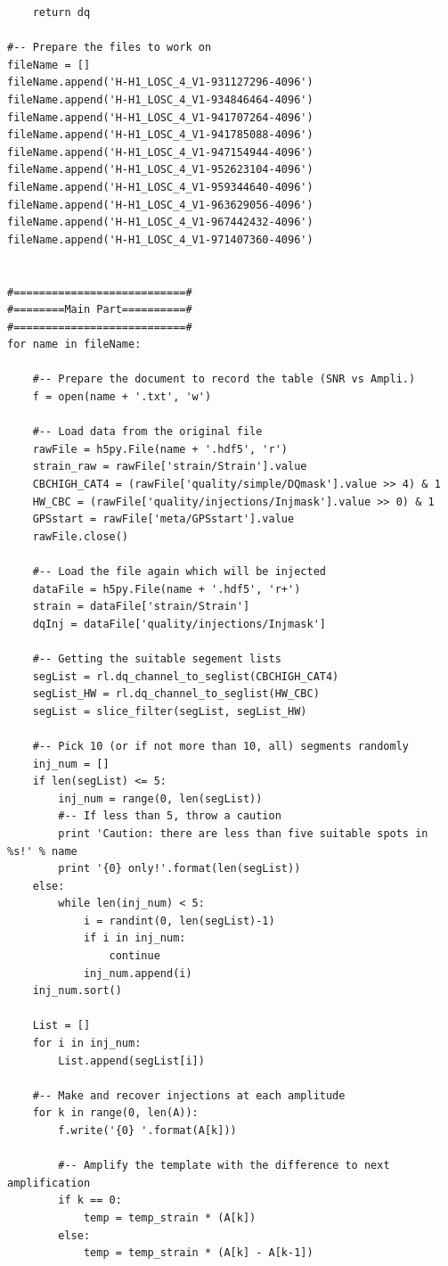 \documentclass[aps,prd,preprint]{revtex4}
\begin{document}
\begin{lstlisting}
    return dq

#-- Prepare the files to work on
fileName = []
fileName.append('H-H1_LOSC_4_V1-931127296-4096')
fileName.append('H-H1_LOSC_4_V1-934846464-4096')
fileName.append('H-H1_LOSC_4_V1-941707264-4096')
fileName.append('H-H1_LOSC_4_V1-941785088-4096')
fileName.append('H-H1_LOSC_4_V1-947154944-4096')
fileName.append('H-H1_LOSC_4_V1-952623104-4096')
fileName.append('H-H1_LOSC_4_V1-959344640-4096')
fileName.append('H-H1_LOSC_4_V1-963629056-4096')
fileName.append('H-H1_LOSC_4_V1-967442432-4096')
fileName.append('H-H1_LOSC_4_V1-971407360-4096')


#===========================#
#========Main Part==========#
#===========================#
for name in fileName:

    #-- Prepare the document to record the table (SNR vs Ampli.)
    f = open(name + '.txt', 'w')

    #-- Load data from the original file
    rawFile = h5py.File(name + '.hdf5', 'r')
    strain_raw = rawFile['strain/Strain'].value
    CBCHIGH_CAT4 = (rawFile['quality/simple/DQmask'].value >> 4) & 1
    HW_CBC = (rawFile['quality/injections/Injmask'].value >> 0) & 1
    GPSstart = rawFile['meta/GPSstart'].value
    rawFile.close()

    #-- Load the file again which will be injected
    dataFile = h5py.File(name + '.hdf5', 'r+')
    strain = dataFile['strain/Strain']
    dqInj = dataFile['quality/injections/Injmask']

    #-- Getting the suitable segement lists
    segList = rl.dq_channel_to_seglist(CBCHIGH_CAT4)
    segList_HW = rl.dq_channel_to_seglist(HW_CBC)
    segList = slice_filter(segList, segList_HW)

    #-- Pick 10 (or if not more than 10, all) segments randomly
    inj_num = []
    if len(segList) <= 5:
        inj_num = range(0, len(segList))
        #-- If less than 5, throw a caution
        print 'Caution: there are less than five suitable spots in %s!' % name
        print '{0} only!'.format(len(segList))
    else:
        while len(inj_num) < 5:
            i = randint(0, len(segList)-1)
            if i in inj_num:
                continue
            inj_num.append(i)
    inj_num.sort()

    List = []
    for i in inj_num:
        List.append(segList[i])

    #-- Make and recover injections at each amplitude
    for k in range(0, len(A)):
        f.write('{0} '.format(A[k]))
        
        #-- Amplify the template with the difference to next amplification
        if k == 0:
            temp = temp_strain * (A[k])
        else:
            temp = temp_strain * (A[k] - A[k-1])


\end{lstlisting}
\end{document}
